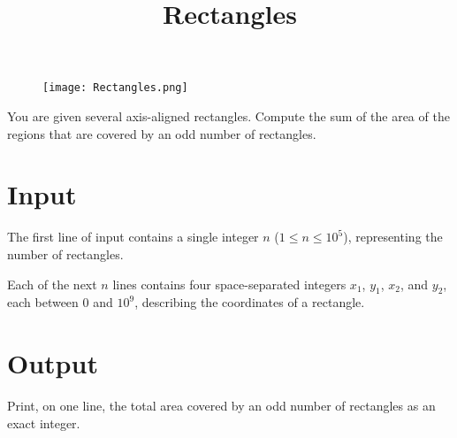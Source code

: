 \documentclass{article}
\title{Rectangles}
\date{}
\begin{document}
\maketitle
\begin{figure}[h!]
\centering
\texttt{[image: Rectangles.png]}
\end{figure}


You are given several axis-aligned rectangles. Compute
the sum of the area of the regions that are covered by an odd number
of rectangles.

\section{Input}

The first line of input contains a single integer $n$ ($1 \le n \le 10^5$),
representing the number of rectangles.

Each of the next $n$ lines contains four space-separated integers
$x_1$, $y_1$, $x_2$, and $y_2$, each between $0$ and $10^9$,
describing the coordinates of a rectangle.

\section{Output}

Print, on one line, the total area covered by an odd number of
rectangles as an exact integer.

\end{document}
